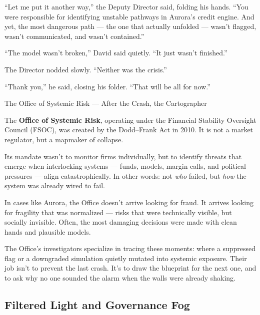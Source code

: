 ``Let me put it another way,'' the Deputy Director said, folding his hands. ``You were responsible for identifying 
unstable pathways in Aurora’s credit engine. And yet, the most dangerous path — the one that actually unfolded 
— wasn’t flagged, wasn’t communicated, and wasn’t contained.''

``The model wasn’t broken,'' David said quietly. ``It just wasn’t finished.''

The Director nodded slowly. ``Neither was the crisis.''

``Thank you,'' he said, closing his folder. ``That will be all for now.''

\medskip

\begin{HistoricalSidebar}{The Office of Systemic Risk --- After the Crash, the Cartographer}

  The \textbf{Office of Systemic Risk}, operating under the Financial Stability Oversight Council (FSOC), 
  was created by the Dodd–Frank Act in 2010. It is not a market regulator, but a mapmaker of collapse.

  \medskip
  
  Its mandate wasn’t to monitor firms individually, but to identify threats that emerge when interlocking 
  systems --- funds, models, margin calls, and political pressures --- align catastrophically. In other words: 
  not \textit{who} failed, but \textit{how} the system was already wired to fail.

  \medskip
  
  In cases like Aurora, the Office doesn’t arrive looking for fraud. It arrives looking for fragility that 
  was normalized — risks that were technically visible, but socially invisible. Often, the most damaging 
  decisions were made with clean hands and plausible models.

  \medskip
  
  The Office’s investigators specialize in tracing these moments: where a suppressed flag or a downgraded 
  simulation quietly mutated into systemic exposure. Their job isn’t to prevent the last crash. It’s to 
  draw the blueprint for the next one, and to ask why no one sounded the alarm when the walls were 
  already shaking.
  
\end{HistoricalSidebar}

\medskip

\subsection{Filtered Light and Governance Fog}

